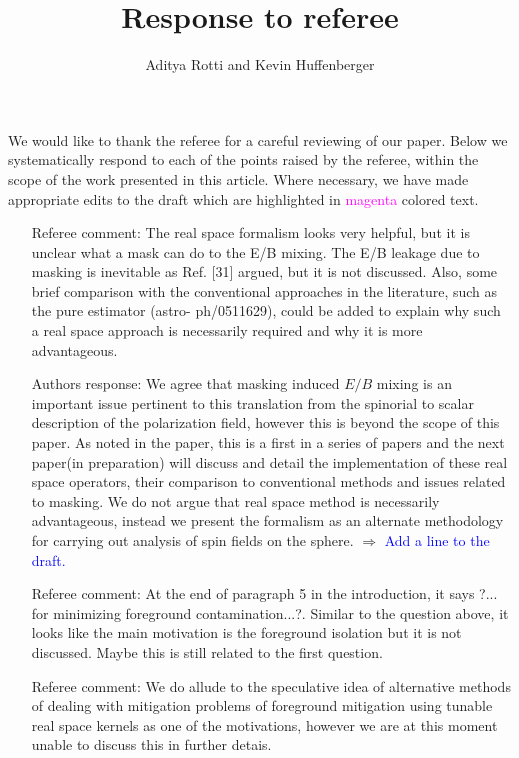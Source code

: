 \documentclass[12pt]{article}
\newcommand{\comment}{ $\Rightarrow$ \textcolor{blue}  }
\begin{document}
\title{Response to referee}
\author{Aditya Rotti and Kevin Huffenberger}
\date{}
\maketitle


We would like to thank the referee for a careful reviewing of our paper.  Below we systematically respond to each of the points raised by the referee, within the scope of the work presented in this article. Where necessary, we have made appropriate edits to the draft which are highlighted in \textcolor{magenta}{magenta} colored text.

\begin{itemize}

\item[{Referee comment: }] The real space formalism looks very helpful, but it is unclear what a mask can do to the E/B mixing. The E/B leakage due to masking is inevitable as Ref. [31] argued, but it is not discussed. Also, some brief comparison with the conventional approaches in the literature, such as the pure estimator (astro- ph/0511629), could be added to explain why such a real space approach is necessarily required and why it is more advantageous.
\item[{Authors response: }] We agree that masking induced $E/B$ mixing is an important issue pertinent to this translation from the spinorial to scalar description of the polarization field, however this is beyond the scope of this paper. As noted in the paper, this is a first in a series of papers and the next paper(in preparation) will discuss and detail the implementation of these real space operators, their comparison to conventional methods and issues related to masking. We do not argue that real space method is necessarily advantageous, instead we present the formalism as an alternate methodology for carrying out analysis of spin fields on the sphere. %
\comment{Add a line to the draft.}

\item[{Referee comment: }]  At the end of paragraph 5 in the introduction, it says ?... for minimizing foreground contamination...?. Similar to the question above, it looks like the main motivation is the foreground isolation but it is not discussed.
Maybe this is still related to the first question. 
\item[{Referee comment: }] We do allude to the speculative idea of alternative methods of dealing with mitigation problems of foreground mitigation using tunable real space kernels as one of the motivations, however we are at this moment unable to discuss this in further detais.\\


\end{itemize}
\end{document}
